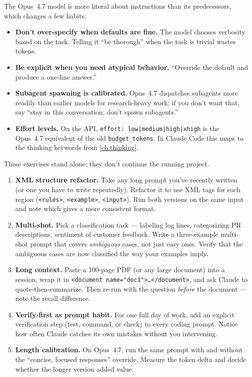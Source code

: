 The Opus~4.7 model is more literal about instructions than its
predecessors, which changes a few habits:

\begin{itemize}
  \item \textbf{Don't over-specify when defaults are fine.} The model
        chooses verbosity based on the task. Telling it ``be thorough''
        when the task is trivial wastes tokens.
  \item \textbf{Be explicit when you need atypical behavior.}
        ``Override the default and produce a one-line answer.''
  \item \textbf{Subagent spawning is calibrated.} Opus~4.7 dispatches
        subagents more readily than earlier models for research-heavy
        work; if you don't want that, say ``stay in this conversation;
        don't spawn subagents.''
  \item \textbf{Effort levels.} On the API, \texttt{effort: low|medium|high|xhigh}
        is the Opus~4.7 equivalent of the old
        \texttt{budget\_tokens}. In Claude Code this maps to the
        thinking keywords from \cref{ch:thinking}.
\end{itemize}

\begin{exercisebox}
These exercises stand alone; they don't continue the running project.

\begin{enumerate}
  \item \textbf{XML structure refactor.} Take any long prompt you've
        recently written (or one you have to write repeatedly). Refactor
        it to use XML tags for each region (\texttt{<rules>},
        \texttt{<example>}, \texttt{<input>}). Run both versions on the
        same input and note which gives a more consistent format.
  \item \textbf{Multi-shot.} Pick a classification task — labeling log
        lines, categorizing PR descriptions, sentiment of customer
        feedback. Write a three-example multi-shot prompt that covers
        \emph{ambiguous} cases, not just easy ones. Verify that the
        ambiguous cases are now classified the way your examples imply.
  \item \textbf{Long context.} Paste a 100-page PDF (or any large
        document) into a session, wrap it in
        \texttt{<document name="doc1">\dots</document>}, and ask Claude
        to quote-then-summarize. Then re-run with the question
        \emph{before} the document — note the recall difference.
  \item \textbf{Verify-first as prompt habit.} For one full day of
        work, add an explicit verification step (test, command, or
        check) to every coding prompt. Notice how often Claude catches
        its own mistakes without you intervening.
  \item \textbf{Length calibration.} On Opus~4.7, run the same prompt
        with and without the ``concise, focused responses'' override.
        Measure the token delta and decide whether the longer version
        added value.
\end{enumerate}
\end{exercisebox}

